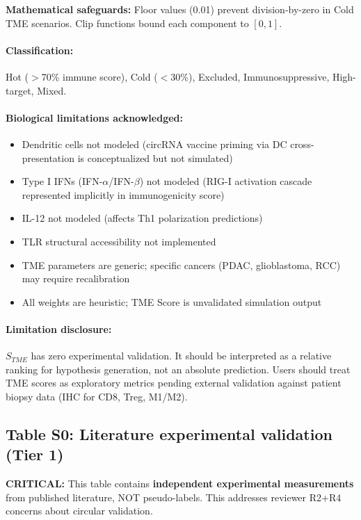 \textbf{Mathematical safeguards:} Floor values (0.01) prevent division-by-zero in Cold TME scenarios. Clip functions bound each component to $[0, 1]$.

\paragraph{Classification:} Hot ($>$70\% immune score), Cold ($<$30\%), Excluded, Immunosuppressive, High-target, Mixed.

\paragraph{Biological limitations acknowledged:}
\begin{itemize}
\item Dendritic cells not modeled (circRNA vaccine priming via DC cross-presentation is conceptualized but not simulated)
\item Type I IFNs (IFN-$\alpha$/IFN-$\beta$) not modeled (RIG-I activation cascade represented implicitly in immunogenicity score)
\item IL-12 not modeled (affects Th1 polarization predictions)
\item TLR structural accessibility not implemented
\item TME parameters are generic; specific cancers (PDAC, glioblastoma, RCC) may require recalibration
\item All weights are heuristic; TME Score is unvalidated simulation output
\end{itemize}

\paragraph{Limitation disclosure:} $S_{TME}$ has zero experimental validation. It should be interpreted as a relative ranking for hypothesis generation, not an absolute prediction. Users should treat TME scores as exploratory metrics pending external validation against patient biopsy data (IHC for CD8, Treg, M1/M2).

\subsection*{Table S0: Literature experimental validation (Tier 1)}

\small \textbf{CRITICAL:} This table contains \textbf{independent experimental measurements} from published literature, NOT pseudo-labels. This addresses reviewer R2+R4 concerns about circular validation.

